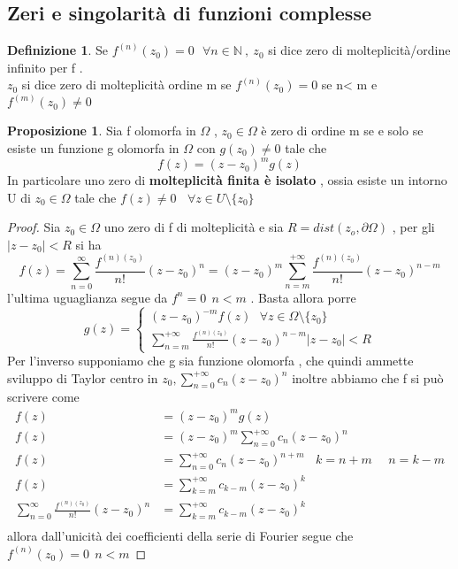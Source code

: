 \documentclass{article}
\theoremstyle{definition}
\newtheorem*{definizione}{Definizione}
\newtheorem*{proposizione}{Proposizione}
\newcommand{\norm}[1]{|#1|}
\begin{document}
	\subsection{Zeri e singolarità di funzioni complesse}
	\begin{definizione}
		Se $f^{(n)}(z_0)=0 \ \ \ \forall n \in \mathbb{N} \ , \ z_0$ si dice zero di molteplicità/ordine infinito per f . \\ $z_0$ si dice zero di molteplicità ordine m se  $f^{(n)}(z_0)= 0$ se n< m e $f^{(m)}(z_0)\neq 0$
	\end{definizione}
	\begin{proposizione}
		Sia f olomorfa in $\Omega$ , $z_0\in \Omega$ è zero di ordine m se e solo se esiste un funzione g olomorfa in $\Omega$ con $g(z_0)\neq 0$ tale che 
		$$f(z)=(z-z_0)^m g(z)$$	
		In particolare uno zero di \textbf{molteplicità finita è isolato } , ossia esiste un intorno U di $z_0\in \Omega$ tale che $f(z)\neq 0\ \ \  \ \forall z \in U \setminus \{z_0\} $
		\end{proposizione}
		\begin{proof}
			Sia $z_0 \in \Omega $ uno zero di f di molteplicità e sia $R=dist(z_o,\partial \Omega)$ , per gli $\norm{z-z_0}< R$ si ha 
			$$f(z)=\sum_{n=0}^{\infty}\frac{f^{(n)(z_0)}}{n!}(z-z_0)^n = (z-z_0)^m \sum_{n=m}^{+\infty}\frac{f^{(n)(z_0)}}{n!}(z-z_0)^{n-m}$$ 
		l'ultima uguaglianza segue da $f^{n}=0 \ \ n < m $ . Basta allora porre 
		$$g(z)=\begin{cases}
			(z-z_0)^{-m}f(z) \ \ \ \forall z \in \Omega \setminus \{z_0\} \\
			\sum_{n=m}^{+\infty}\frac{f^{(n)(z_0)}}{n!}(z-z_0)^{n-m} \norm{z-z_0} < R
 		\end{cases}$$
 		Per l'inverso supponiamo che g sia funzione olomorfa , che quindi ammette sviluppo di Taylor centro in $z_0 , \sum_{n=0}^{+\infty}c_n (z-z_0)^n$ inoltre abbiamo che f si può scrivere come 
 		\begin{align*}
 			f(z)&=(z-z_0)^m g(z) \\
 			f(z)&=(z-z_0)^m \sum_{n=0}^{+\infty}c_n(z-z_0)^n\\
 			f(z)&= \sum_{n=0}^{+\infty}c_n(z-z_0)^{n+m} \ \ \ \ k=n+m \ \ \ \ \ \ n=k-m\\
 			f(z) & = \sum_{k=m}^{+\infty}c_{k-m}(z-z_0)^{k} \\
 			\sum_{n=0}^{\infty}\frac{f^{(n)(z_0)}}{n!}(z-z_0)^n & = \sum_{k=m}^{+\infty}c_{k-m}(z-z_0)^{k} \\
 		\end{align*} 		
 		allora dall'unicità dei coefficienti della serie di Fourier segue che $f^{(n)}(z_0)=0 \ \ n<m$
				\end{proof}
\end{document}
